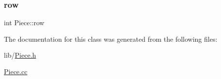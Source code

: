 \mbox{\label{class_piece_ac6ef7c474f20562cb629c2452ce0631d}} 
\subsubsection{\texorpdfstring{row}{row}}
{\footnotesize\ttfamily int Piece\+::row\hspace{0.3cm}{\ttfamily [private]}}



The documentation for this class was generated from the following files\+:\begin{DoxyCompactItemize}
\item 
lib/\hyperlink{_piece_8h}{Piece.\+h}\item 
\hyperlink{_piece_8cc}{Piece.\+cc}\end{DoxyCompactItemize}
